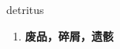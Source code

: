 
\begin{frame}
{\huge detritus}
\begin{center}
\begin{enumerate}\Large
  \item \textbf{废品，碎屑，遗骸}
\end{enumerate}
\end{center}
\end{frame}

